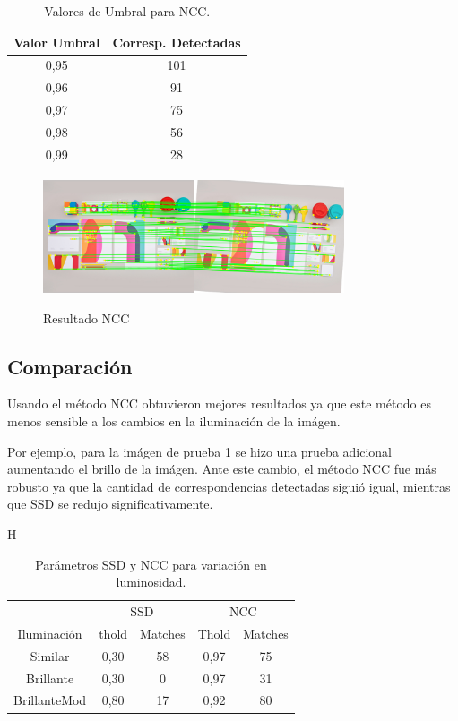 \documentclass{IEEEtran}
\begin{document}
\begin{table}[H]
\centering
\begin{tabular}{*2c}
\toprule
Valor Umbral & Corresp. Detectadas\\
\midrule
0,95 & 101\\
0,96 & 91\\
0,97 & 75\\
0,98 & 56\\
0,99 & 28\\
\bottomrule
\end{tabular}
\caption{Valores de Umbral para NCC.}
\label{tb:tncc}
\end{table} 


\begin{figure}[H]
\caption{Resultado NCC}
\centering
\includegraphics[width=8.9cm,natwidth=1200,natheight=450]{figs/ncc.png}
\label{fig:ncc}
\end{figure} 

\subsection{Comparación}
Usando el método NCC obtuvieron mejores resultados ya que este método es menos sensible a los cambios en la iluminación de la imágen.

Por ejemplo, para la imágen de prueba 1 se hizo una prueba adicional aumentando el
brillo de la imágen. Ante este cambio, el método NCC fue más robusto ya que la 
cantidad de correspondencias detectadas siguió igual, mientras que SSD se redujo 
significativamente.

\begin{table}{H}
\centering
\begin{tabular}{*5c}
\toprule
& \multicolumn{2}{c}{SSD} & \multicolumn{2}{c}{NCC} \\
Iluminación & thold & Matches & Thold & Matches \\ 
\midrule
Similar & 0,30 & 58 & 0,97 & 75 \\
Brillante & 0,30 & 0 & 0,97 & 31 \\
BrillanteMod & 0,80 & 17 & 0,92 & 80 \\
\bottomrule
\end{tabular}
\caption{Parámetros SSD y NCC para variación en luminosidad.}
\label{tb:ssdncc}
\end{table} 
\end{document}
